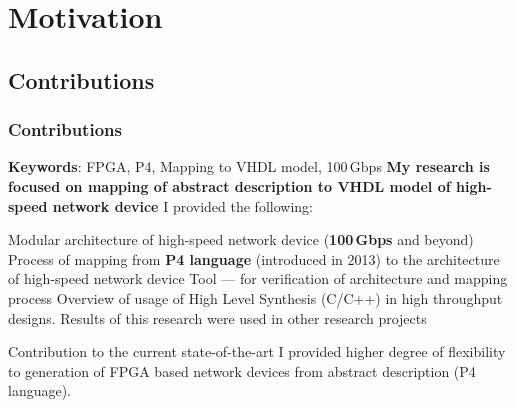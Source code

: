 \section{Motivation}
\subsection*{Contributions}
\begin{frame}
    \frametitle{Contributions}
    \begin{itemize}
        \fitem \textbf{Keywords}: FPGA, P4, Mapping to VHDL model, 100\,Gbps
        \fitem \textbf{My research is focused on mapping of abstract description to VHDL model of high-speed network device}
        \fitem I provided the following:
        \begin{enumerate}
            \fitem Modular architecture of high-speed network device (\textbf{100\,Gbps} and beyond)
            \fitem Process of mapping from \textbf{P4 language} (introduced in 2013) to the architecture of high-speed network device
            \fitem Tool --- for verification of architecture and mapping process
            \fitem Overview of usage of High Level Synthesis (C/C++) in high throughput designs. 
            Results of this research were used in other research projects
        \end{enumerate}
    \end{itemize}
    \begin{block}{Contribution to the current state-of-the-art}
        I provided higher degree of flexibility to generation of FPGA based network devices from abstract description (P4 language).
    \end{block}
\end{frame}

